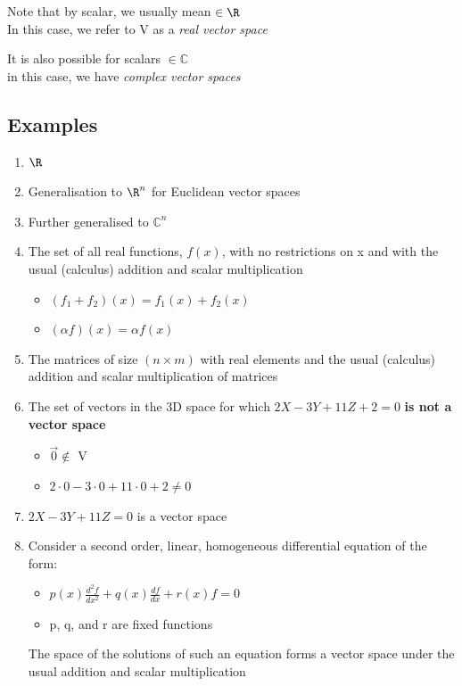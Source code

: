 \documentclass[a4paper, 11pt, normalem]{report}
\begin{document}
Note that by scalar, we usually mean $\in \R$ \\
In this case, we refer to V as a \emph{real vector space}

It is also possible for scalars $\in \mathbb{C}$ \\
in this case, we have \emph{complex vector spaces}

\subsection{Examples}
\begin{enumerate}
    \item $\R$
    \item Generalisation to $\R^n$ for Euclidean vector spaces
    \item Further generalised to $\mathbb{C}^n$
    \item The set of all real functions, $f(x)$, with no restrictions on x and with the usual (calculus) addition and scalar multiplication
        \begin{itemize}
            \item $(f_1 + f_2 )(x) = f_{1}(x) + f_{2}(x)$
            \item $(\alpha f)(x) = \alpha f(x)$
        \end{itemize}
    \item The matrices of size $(n \times m)$ with real elements and the usual (calculus) addition and scalar multiplication of matrices
    \item The set of vectors in the 3D space for which $2X - 3Y + 11Z + 2 = 0$ \textbf{is not a vector space}
        \begin{itemize}
            \item $\vec{0} \notin$ V
            \item $2\cdot0 - 3\cdot0 + 11\cdot0 + 2 \neq 0$
        \end{itemize}
    \item $2X - 3Y + 11Z = 0$ is a vector space
    \item Consider a second order, linear, homogeneous differential equation of the form:
        \begin{itemize}
            \item $p(x)\frac{d^{2}f}{dx^2} + q(x)\frac{df}{dx} + r(x)f = 0$
            \item p, q, and r are fixed functions
        \end{itemize}
        The space of the solutions of such an equation forms a vector space under the usual addition and scalar multiplication
\end{enumerate}
\end{document}
